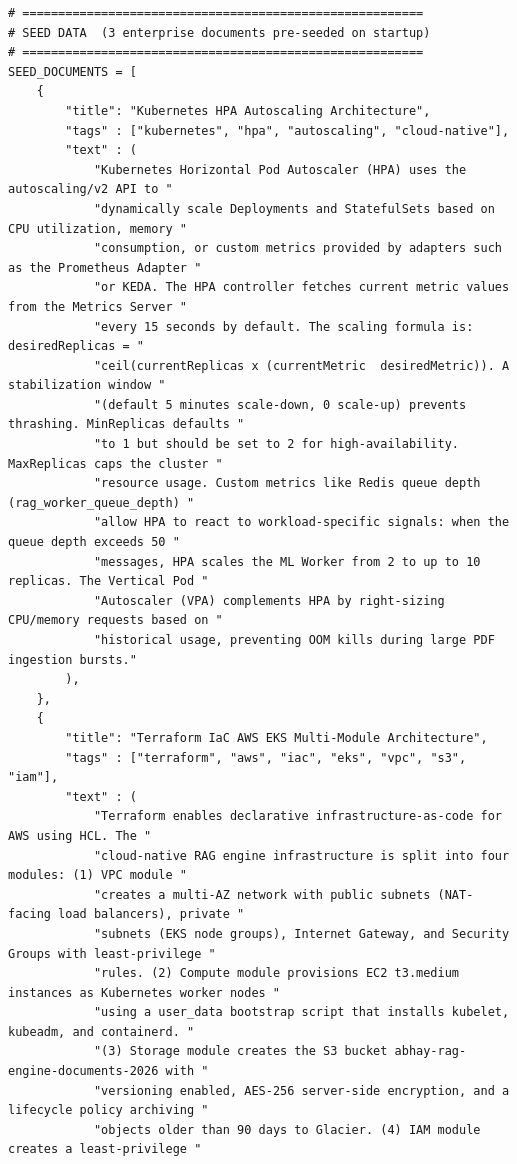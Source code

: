 \documentclass[12pt,a4paper]{report}
\begin{document}
\begin{lstlisting}
# ========================================================
# SEED DATA  (3 enterprise documents pre-seeded on startup)
# ========================================================
SEED_DOCUMENTS = [
    {
        "title": "Kubernetes HPA Autoscaling Architecture",
        "tags" : ["kubernetes", "hpa", "autoscaling", "cloud-native"],
        "text" : (
            "Kubernetes Horizontal Pod Autoscaler (HPA) uses the autoscaling/v2 API to "
            "dynamically scale Deployments and StatefulSets based on CPU utilization, memory "
            "consumption, or custom metrics provided by adapters such as the Prometheus Adapter "
            "or KEDA. The HPA controller fetches current metric values from the Metrics Server "
            "every 15 seconds by default. The scaling formula is: desiredReplicas = "
            "ceil(currentReplicas x (currentMetric  desiredMetric)). A stabilization window "
            "(default 5 minutes scale-down, 0 scale-up) prevents thrashing. MinReplicas defaults "
            "to 1 but should be set to 2 for high-availability. MaxReplicas caps the cluster "
            "resource usage. Custom metrics like Redis queue depth (rag_worker_queue_depth) "
            "allow HPA to react to workload-specific signals: when the queue depth exceeds 50 "
            "messages, HPA scales the ML Worker from 2 to up to 10 replicas. The Vertical Pod "
            "Autoscaler (VPA) complements HPA by right-sizing CPU/memory requests based on "
            "historical usage, preventing OOM kills during large PDF ingestion bursts."
        ),
    },
    {
        "title": "Terraform IaC AWS EKS Multi-Module Architecture",
        "tags" : ["terraform", "aws", "iac", "eks", "vpc", "s3", "iam"],
        "text" : (
            "Terraform enables declarative infrastructure-as-code for AWS using HCL. The "
            "cloud-native RAG engine infrastructure is split into four modules: (1) VPC module "
            "creates a multi-AZ network with public subnets (NAT-facing load balancers), private "
            "subnets (EKS node groups), Internet Gateway, and Security Groups with least-privilege "
            "rules. (2) Compute module provisions EC2 t3.medium instances as Kubernetes worker nodes "
            "using a user_data bootstrap script that installs kubelet, kubeadm, and containerd. "
            "(3) Storage module creates the S3 bucket abhay-rag-engine-documents-2026 with "
            "versioning enabled, AES-256 server-side encryption, and a lifecycle policy archiving "
            "objects older than 90 days to Glacier. (4) IAM module creates a least-privilege "

\end{lstlisting}
\end{document}
